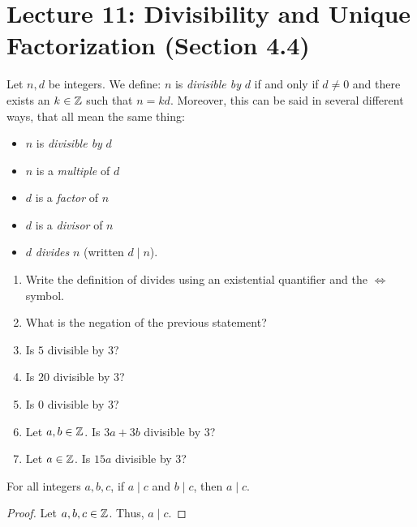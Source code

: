 \section*{Lecture 11: Divisibility and Unique Factorization (Section 4.4)}

\begin{definition}[Divides]
    Let $n,d$ be integers.  We define: $n$ is \emph{divisible by} $d$
    if and only if
    $d \neq 0$ and there exists an $k \in {\mathbb Z}$ such
    that $n=kd$.  Moreover, this can be said in several different ways, that all
    mean the same thing:
    \begin{itemize}
        \item $n$ is \emph{divisible by} $d$
        \item $n$ is a \emph{multiple} of $d$
        \item $d$ is a \emph{factor} of $n$
        \item $d$ is a \emph{divisor} of $n$
        \item $d$ \emph{divides} $n$ (written $d \mid n$).
    \end{itemize}
\end{definition}



\begin{enumerate}
    \item Write the definition of divides using an existential quantifier and
        the $\iff$ symbol.
       \practice
    \item What is the negation of the previous statement?
       \practice
    \item Is $5$ divisible by $3$?
       \practice
    \pagebreak
    \item Is $20$ divisible by $3$?
       \practice
    \item Is $0$ divisible by $3$?
       \practice
    \item Let $a,b \in {\mathbb Z}$. Is $3a+3b$ divisible by $3$?
       \practice
    \item Let $a \in {\mathbb Z}$. Is $15a$ divisible by $3$?
       \practice
\end{enumerate}


\pagebreak

\begin{theorem}
    For all integers $a,b,c$, if $a \mid c$ and $b \mid c$, then $a \mid c$.
\end{theorem}
\begin{proof}
    Let $a,b,c \in {\mathbb Z}$.
    \proofspace
    Thus, $a \mid c$.
\end{proof}

